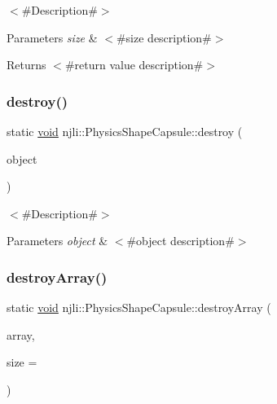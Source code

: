 $<$\#\+Description\#$>$


\begin{DoxyParams}{Parameters}
{\em size} & $<$\#size description\#$>$\\
\hline
\end{DoxyParams}
\begin{DoxyReturn}{Returns}
$<$\#return value description\#$>$ 
\end{DoxyReturn}
\mbox{\label{classnjli_1_1_physics_shape_capsule_ab8862c509b556bab997e596e4181fdd8}} 
\subsubsection{\texorpdfstring{destroy()}{destroy()}}
{\footnotesize\ttfamily static \mbox{\hyperlink{_thread_8h_af1e856da2e658414cb2456cb6f7ebc66}{void}} njli\+::\+Physics\+Shape\+Capsule\+::destroy (\begin{DoxyParamCaption}\item[{\mbox{\hyperlink{classnjli_1_1_physics_shape_capsule}{Physics\+Shape\+Capsule}} $\ast$}]{object }\end{DoxyParamCaption})\hspace{0.3cm}{\ttfamily [static]}}

$<$\#\+Description\#$>$


\begin{DoxyParams}{Parameters}
{\em object} & $<$\#object description\#$>$ \\
\hline
\end{DoxyParams}
\mbox{\label{classnjli_1_1_physics_shape_capsule_a1208e5bd3514c6a4259b312322575e2a}} 
\subsubsection{\texorpdfstring{destroy\+Array()}{destroyArray()}}
{\footnotesize\ttfamily static \mbox{\hyperlink{_thread_8h_af1e856da2e658414cb2456cb6f7ebc66}{void}} njli\+::\+Physics\+Shape\+Capsule\+::destroy\+Array (\begin{DoxyParamCaption}\item[{\mbox{\hyperlink{classnjli_1_1_physics_shape_capsule}{Physics\+Shape\+Capsule}} $\ast$$\ast$}]{array,  }\item[{const \mbox{\hyperlink{_util_8h_a10e94b422ef0c20dcdec20d31a1f5049}{u32}}}]{size = {} }\end{DoxyParamCaption})\hspace{0.3cm}{\ttfamily [static]}}

